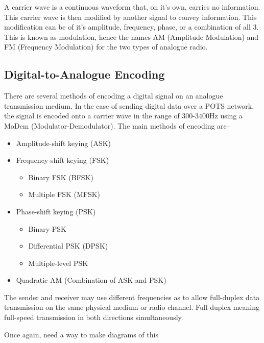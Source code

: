 A carrier wave is a continuous waveform that, on it's own, carries no information. This carrier wave is then modified
 by another signal to convey information. This modification can be of it's amplitude, frequency, phase, or a combination
 of all 3. This is known as modulation, hence the names AM (Amplitude Modulation) and FM (Frequency Modulation) for the
 two types of analogue radio.

\subsection*{Digital-to-Analogue Encoding}

There are several methods of encoding a digital signal on an analogue transmission medium. In the case of sending
 digital data over a POTS network, the signal is encoded onto a carrier wave in the range of $300$-$3400$Hz using a
 MoDem (Modulator-Demodulator). The main methods of encoding are--

\begin{itemize}
  \item Amplitude-shift keying (ASK)
  \item Frequency-shift keying (FSK)
  \begin{itemize}
    \item Binary FSK (BFSK)
    \item Multiple FSK (MFSK)
  \end{itemize}
  \item Phase-shift keying (PSK)
  \begin{itemize}
    \item Binary PSK
    \item Differential PSK (DPSK)
    \item Multiple-level PSK
  \end{itemize}
  \item Quadratic AM (Combination of ASK and PSK)
\end{itemize}

The sender and receiver may use different frequencies as to allow full-duplex data transmission on the same physical
 medium or radio channel. Full-duplex meaning full-speed transmission in both directions simultaneously.

{\Huge Once again, need a way to make diagrams of this}